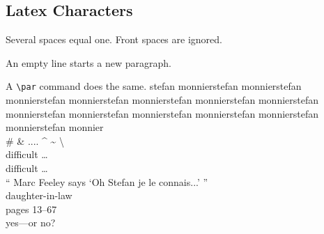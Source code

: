 \documentclass{ctexart}
\begin{document}
      \subsection{Latex Characters}


            \indent Several spaces    equal one.
                  Front spaces are ignored.

            An empty line starts a new paragraph. \par
            A \verb|\par| command does the same.
            stefan monnierstefan monnierstefan monnierstefan monnierstefan monnierstefan monnierstefan monnierstefan monnierstefan monnierstefan monnierstefan monnierstefan monnierstefan monnierstefan monnier \\

            \# \& .... \^{} \~{} \textbackslash \\

            difficult \ldots \\
            dif{}f{}icult \ldots \\


            `` Marc Feeley says `Oh Stefan je le connais...' ''\\

            daughter-in-law\\        
            pages 13--67 \\
            yes---or no?
\end{document}
